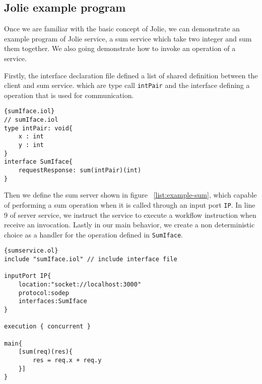 \subsection{Jolie example program}

Once we are familiar with the basic concept of Jolie, we can demonstrate an example program of Jolie service, a sum service which take two integer and sum them together. We also going demonstrate how to invoke an operation of a service.

Firstly, the interface declaration file defined a list of shared definition between the client and sum service. which are type call \texttt{intPair} and the interface defining a operation that is used for communication.

\begin{listing}[ht]
    \lstset{language=Jolie,
        style=codeStyle
    }
    \begin{lstlisting}[frame=tlrb,caption={Sum service interface}, basicstyle=\footnotesize, label={list:example-iol}]{sumIface.iol}
// sumIface.iol
type intPair: void{
    x : int
    y : int
}
interface SumIface{
    requestResponse: sum(intPair)(int)
}
\end{lstlisting}
\end{listing}

Then we define the sum server shown in figure ~\ref{list:example-sum}, which capable of performing a sum operation when it is called through an input port \texttt{IP}. In line 9 of server service, we instruct the service to execute a workflow instruction when receive an invocation. Lastly in our main behavior, we create a non deterministic choice as a handler for the operation defined in \texttt{SumIface}.

\begin{listing}[ht]
    \lstset{language=Jolie,
        style=codeStyle,
        numbers=left,
        firstnumber=1
    }
    \begin{lstlisting}[frame=tlrb,basicstyle=\footnotesize, caption= {Sum service}, label={list:example-sum} ]{sumservice.ol}
include "sumIface.iol" // include interface file

inputPort IP{
    location:"socket://localhost:3000"
    protocol:sodep 
    interfaces:SumIface
}

execution { concurrent }

main{
    [sum(req)(res){
        res = req.x + req.y
    }]
}
\end{lstlisting}
\end{listing}

